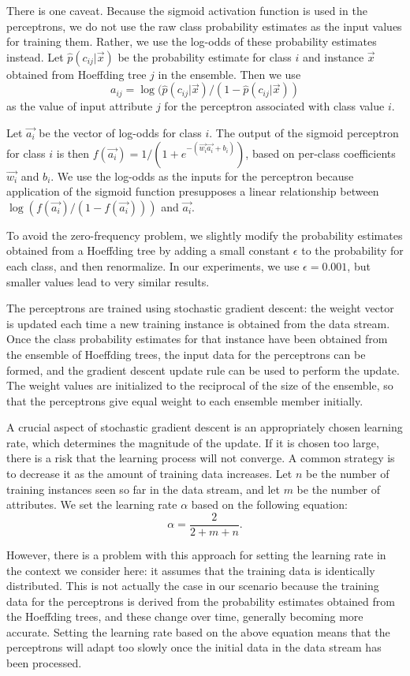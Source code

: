 There is one caveat. Because the sigmoid activation function is used
in the perceptrons, we do not use the raw class probability estimates
as the input values for training them. Rather, we use the log-odds of
these probability estimates instead. Let $\hat p(c_{ij}|\vec{x})$ be
the probability estimate for class $i$ and instance $\vec{x}$ obtained
from Hoeffding tree $j$ in the ensemble. Then we use
$$
a_{ij}=\log(\hat p(c_{ij}|\vec{x})/(1-\hat p(c_{ij}|\vec{x}))
$$ as the value of input attribute $j$ for the perceptron associated
with class value $i$.

Let $\vec{a_{i}}$ be the vector of log-odds for class $i$. The output
of the sigmoid perceptron for class $i$ is then
$f(\vec{a_i})=1/(1+e^{-(\vec{w_i}\vec{a_i}+b_i)})$, based on per-class
coefficients $\vec{w_i}$ and $b_i$. We use the log-odds as the inputs
for the perceptron because application of the sigmoid function
presupposes a linear relationship between $\log(f(\vec{a_i})/(1-f(\vec{a_i})))$
and $\vec{a_i}$.

To avoid the zero-frequency problem, we slightly modify the
probability estimates obtained from a Hoeffding tree by adding a small
constant $\epsilon$ to the probability for each class, and then
renormalize. In our experiments, we use $\epsilon=0.001$, but smaller
values lead to very similar results.

The perceptrons are trained using stochastic gradient descent: the
weight vector is updated each time a new training instance is obtained
from the data stream. Once the class probability estimates for that
instance have been obtained from the ensemble of Hoeffding trees, the
input data for the perceptrons can be formed, and the gradient descent
update rule can be used to perform the update. The weight values are
initialized to the reciprocal of the size of the ensemble, so that the
perceptrons give equal weight to each ensemble member initially.

A crucial aspect of stochastic gradient descent is an appropriately
chosen learning rate, which determines the magnitude of the update. If
it is chosen too large, there is a risk that the learning process will
not converge. A common strategy is to decrease it as the amount of
training data increases. Let $n$ be the number of training instances
seen so far in the data stream, and let $m$ be the number of
attributes. We set the learning rate $\alpha$ based on the following
equation: $$ \alpha=\frac{2}{2+m+n}.  $$

However, there is a problem with this approach for setting the
learning rate in the context we consider here: it assumes that the
training data is identically distributed. This is not actually the case
in our scenario because the training data for the perceptrons is
derived from the probability estimates obtained from the Hoeffding
trees, and these change over time, generally becoming more
accurate. Setting the learning rate based on the above equation means
that the perceptrons will adapt too slowly once the initial data in
the data stream has been processed.

